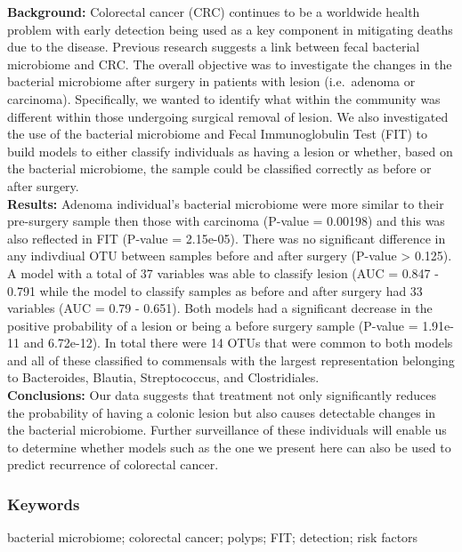 \documentclass[12pt,]{article}
\begin{document}
\textbf{Background:} Colorectal cancer (CRC) continues to be a worldwide
health problem with early detection being used as a key component in
mitigating deaths due to the disease. Previous research suggests a link
between fecal bacterial microbiome and CRC. The overall objective was to
investigate the changes in the bacterial microbiome after surgery in
patients with lesion (i.e.~adenoma or carcinoma). Specifically, we
wanted to identify what within the community was different within those
undergoing surgical removal of lesion. We also investigated the use of
the bacterial microbiome and Fecal Immunoglobulin Test (FIT) to build
models to either classify individuals as having a lesion or whether,
based on the bacterial microbiome, the sample could be classified
correctly as before or after surgery.\\
\textbf{Results:} Adenoma individual's bacterial microbiome were more
similar to their pre-surgery sample then those with carcinoma (P-value =
0.00198) and this was also reflected in FIT (P-value = 2.15e-05). There
was no significant difference in any indivdiual OTU between samples
before and after surgery (P-value \textgreater{} 0.125). A model with a
total of 37 variables was able to classify lesion (AUC = 0.847 - 0.791
while the model to classify samples as before and after surgery had 33
variables (AUC = 0.79 - 0.651). Both models had a significant decrease
in the positive probability of a lesion or being a before surgery sample
(P-value = 1.91e-11 and 6.72e-12). In total there were 14 OTUs that were
common to both models and all of these classified to commensals with the
largest representation belonging to Bacteroides, Blautia, Streptococcus,
and Clostridiales.\\
\textbf{Conclusions:} Our data suggests that treatment not only
significantly reduces the probability of having a colonic lesion but
also causes detectable changes in the bacterial microbiome. Further
surveillance of these individuals will enable us to determine whether
models such as the one we present here can also be used to predict
recurrence of colorectal cancer.

\newpage

\subsubsection{Keywords}\label{keywords}

bacterial microbiome; colorectal cancer; polyps; FIT; detection; risk
factors

\newpage
\end{document}
